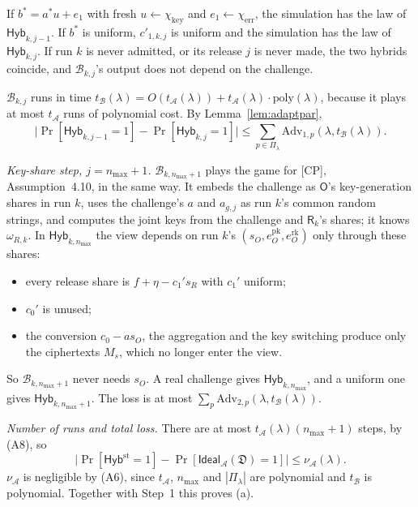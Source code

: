 \documentclass[11pt]{article}
\theoremstyle{definition}
\theoremstyle{plain}
\newcommand{\Rp}{\mathsf{R}}
\newcommand{\Op}{\mathsf{O}}
\newcommand{\fs}{f}
\newcommand{\chikey}{\chi_{\mathrm{key}}}
\newcommand{\chierr}{\chi_{\mathrm{err}}}
\newcommand{\bD}{\mathfrak D}
\newcommand{\Hyb}{\mathsf{Hyb}}
\newcommand{\Ideal}{\mathsf{Ideal}}
\newcommand{\Adv}{\mathrm{Adv}}
\newcommand{\CP}{\textup{[CP]}}
\begin{document}
If $b^*=a^*u+e_1$ with fresh $u\gets\chikey$ and $e_1\gets\chierr$, the simulation has the law of $\Hyb_{k,j-1}$. If $b^*$ is uniform, $c'_{1,k,j}$ is uniform and the simulation has the law of $\Hyb_{k,j}$. If run $k$ is never admitted, or its release $j$ is never made, the two hybrids coincide, and $\mathcal B_{k,j}$'s output does not depend on the challenge.

$\mathcal B_{k,j}$ runs in time $t_{\mathcal B}(\lambda)=O(t_{\mathcal A}(\lambda))+t_{\mathcal A}(\lambda)\cdot\mathrm{poly}(\lambda)$, because it plays at most $t_{\mathcal A}$ runs of polynomial cost. By Lemma~\ref{lem:adaptpar},
\[
  \bigl|\Pr[\Hyb_{k,j-1}=1]-\Pr[\Hyb_{k,j}=1]\bigr|\le\sum_{p\in\Pi_\lambda}\Adv_{1,p}(\lambda,t_{\mathcal B}(\lambda)) .
\]

\emph{Key-share step, $j=n_{\max}+1$.} $\mathcal B_{k,n_{\max}+1}$ plays the game for \CP, Assumption~4.10, in the same way. It embeds the challenge as $\Op$'s key-generation shares in run $k$, uses the challenge's $a$ and $a_{g,j}$ as run $k$'s common random strings, and computes the joint keys from the challenge and $\Rp_k$'s shares; it knows $\omega_{R,k}$. In $\Hyb_{k,n_{\max}}$ the view depends on run $k$'s $(s_O,e^{\mathrm{pk}}_O,e^{\mathrm{rk}}_O)$ only through these shares:
\begin{itemize}[nosep]
  \item every release share is $\fs+\eta-c_1's_R$ with $c_1'$ uniform;
  \item $c_0'$ is unused;
  \item the conversion $c_0-as_O$, the aggregation and the key switching produce only the ciphertexts $M_s$, which no longer enter the view.
\end{itemize}
So $\mathcal B_{k,n_{\max}+1}$ never needs $s_O$. A real challenge gives $\Hyb_{k,n_{\max}}$, and a uniform one gives $\Hyb_{k,n_{\max}+1}$. The loss is at most $\sum_p\Adv_{2,p}(\lambda,t_{\mathcal B}(\lambda))$.

\emph{Number of runs and total loss.} There are at most $t_{\mathcal A}(\lambda)(n_{\max}+1)$ steps, by (A8), so
\[
  \bigl|\Pr[\Hyb^{\mathrm{st}}=1]-\Pr[\Ideal_{\mathcal A}(\bD)=1]\bigr|\le\nu_{\mathcal A}(\lambda) .
\]
$\nu_{\mathcal A}$ is negligible by (A6), since $t_{\mathcal A}$, $n_{\max}$ and $|\Pi_\lambda|$ are polynomial and $t_{\mathcal B}$ is polynomial. Together with Step~1 this proves (a).
\end{document}
